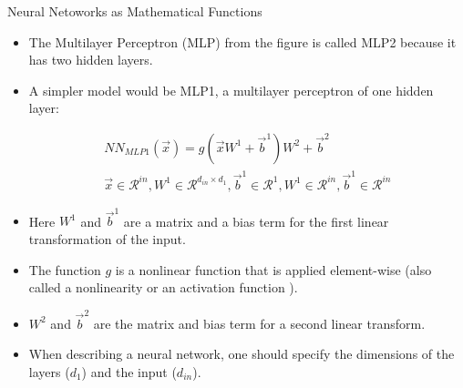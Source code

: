 \documentclass[handout]{beamer}
\begin{document}
\begin{frame}{Neural Netoworks as Mathematical Functions}
\begin{scriptsize}
\begin{itemize}
\item The Multilayer Perceptron (MLP) from the figure is called MLP2 because it has two hidden layers.
\item A simpler model would be MLP1, a multilayer perceptron of one hidden layer:
\begin{center}
\begin{equation}
\begin{split}
NN_{MLP1}(\vec{x}) = g(\vec{x}W^{1}+\vec{b}^{1})W^{2}+\vec{b}^{2} \\
\vec{x} \in \mathcal{R}^{in}, W^{1} \in \mathcal{R}^{d_{in}\times d_{1}}, \vec{b}^{1} \in \mathcal{R}^{1}, W^{1} \in \mathcal{R}^{in}, \vec{b}^{1} \in \mathcal{R}^{in}   
\end{split}
\end{equation}
\end{center}

\item Here $W^{1}$ and $\vec{b}^{1}$ are a matrix and a bias term for the first linear transformation of the input.
\item The function $g$ is a nonlinear function that is applied element-wise (also called a nonlinearity or an activation function ).
\item $W^{2}$ and $\vec{b}^{2}$ are the matrix and bias term for a second linear transform.

\item When describing a neural network, one should specify the dimensions of the layers ($d_{1}$) and the input ($d_{in}$).
\end{itemize}


\end{scriptsize}
\end{frame}
\end{document}
